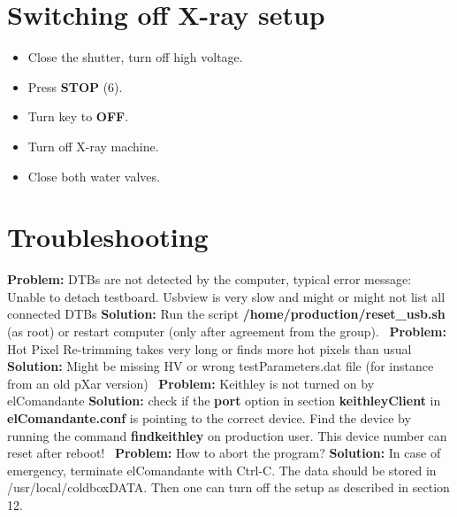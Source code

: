 \documentclass[fleqn,10pt]{SelfArx} %
\newcommand{\prob}[1]{{\textbf{Problem: } #1}\newline}
\newcommand{\sol}[1]{{\textbf{Solution: } #1 \newline \,\newline}}
\begin{document}
\section{Switching off X-ray setup}
\begin{itemize}
\item {Close the shutter, turn off high voltage.}
\item {Press \textbf{STOP} (6).}
\item {Turn key to \textbf{OFF}.}
\item {Turn off X-ray machine.}
\item {Close both water valves.}
\end{itemize}

\section{Troubleshooting}

\prob{DTBs are not detected by the computer, typical error message: Unable to detach testboard. Usbview is very slow and might or might not list all connected DTBs}
\sol{Run the script \textbf{/home/production/reset\_usb.sh} (as root) or restart computer (only after agreement from the group).}
\prob{Hot Pixel Re-trimming takes very long or finds more hot pixels than usual}
\sol{Might be missing HV or wrong testParameters.dat file (for instance from an old pXar version)}
\prob{Keithley is not turned on by elComandante}
\sol{check if the \textbf{port} option in section \textbf{keithleyClient} in \textbf{elComandante.conf} is pointing to the correct device. Find the device by running the command \mbox{\textbf{findkeithley}} on production user. This device number can reset after reboot!}
\prob{How to abort the program?}
\sol{In case of emergency, terminate elComandante with Ctrl-C. The data should be stored in /usr/local/coldboxDATA. Then one can turn off the setup as described in section 12.}











\end{document}
